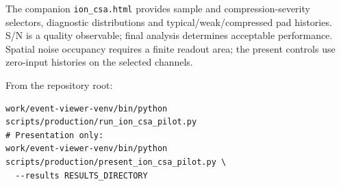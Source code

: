 \documentclass[10pt,a4paper]{article}
\begin{document}
The companion \texttt{ion\_csa.html} provides sample and compression-severity
selectors, diagnostic distributions and typical/weak/compressed pad histories.
S/N is a quality observable; final analysis determines acceptable performance.
Spatial noise occupancy requires a finite readout area; the present controls
use zero-input histories on the selected channels.

From the repository root:
\begin{verbatim}
work/event-viewer-venv/bin/python scripts/production/run_ion_csa_pilot.py
# Presentation only:
work/event-viewer-venv/bin/python scripts/production/present_ion_csa_pilot.py \
  --results RESULTS_DIRECTORY
\end{verbatim}
\end{document}
